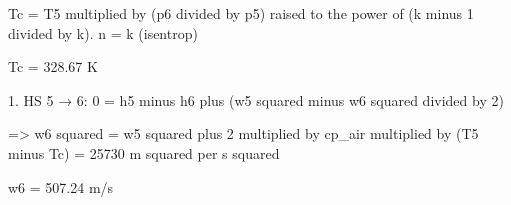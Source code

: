 Tc = T5 multiplied by (p6 divided by p5) raised to the power of (k minus 1 divided by k).  
n = k (isentrop)  

Tc = 328.67 K  

1. HS 5 → 6:  
0 = h5 minus h6 plus (w5 squared minus w6 squared divided by 2)  

=> w6 squared = w5 squared plus 2 multiplied by cp_air multiplied by (T5 minus Tc) = 25730 m squared per s squared  

w6 = 507.24 m/s